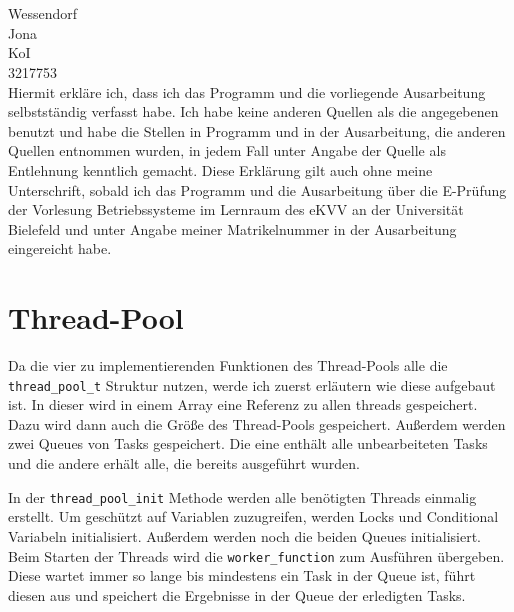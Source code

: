 \documentclass[12pt,a4paper]{article}
\begin{document}
\newcommand{\3}{\ss}

\begin{center}
  \\[1cm]
  \\[3cm]
\end{center}

 Wessendorf\\

 Jona\\

 KoI\\

 3217753\\[3cm]

\noindent Hiermit erkläre ich, dass ich das Programm und die
vorliegende Ausarbeitung selbstständig verfasst habe. Ich habe keine
anderen Quellen als die angegebenen benutzt und habe die Stellen in
Programm und in der Ausarbeitung, die anderen Quellen entnommen
wurden, in jedem Fall unter Angabe der Quelle als Entlehnung kenntlich
gemacht. Diese Erklärung gilt auch ohne meine Unterschrift, sobald ich
das Programm und die Ausarbeitung über die E-Prüfung der Vorlesung
Betriebssysteme im Lernraum des eKVV an der Universität Bielefeld
und unter Angabe meiner Matrikelnummer in der Ausarbeitung eingereicht
habe.

\thispagestyle{empty}
\newpage
\setcounter{page}{1}

\section{Thread-Pool}

Da die vier zu implementierenden Funktionen des Thread-Pools alle die
\texttt{thread\_pool\_t} Struktur nutzen, werde ich zuerst erläutern wie diese aufgebaut ist.
In dieser wird in einem Array eine Referenz zu allen threads gespeichert.
Dazu wird dann auch die Größe des Thread-Pools gespeichert.
Außerdem werden zwei Queues von Tasks gespeichert.
Die eine enthält alle unbearbeiteten Tasks und die andere erhält alle, die bereits ausgeführt wurden.

In der \texttt{thread\_pool\_init} Methode werden alle benötigten Threads einmalig erstellt.
Um geschützt auf Variablen zuzugreifen, werden Locks und Conditional Variabeln initialisiert.
Außerdem werden noch die beiden Queues initialisiert.
Beim Starten der Threads wird die \texttt{worker\_function} zum Ausführen übergeben.
Diese wartet immer so lange bis mindestens ein Task in der Queue ist,
führt diesen aus und speichert die Ergebnisse in der Queue der erledigten Tasks.
\end{document}
